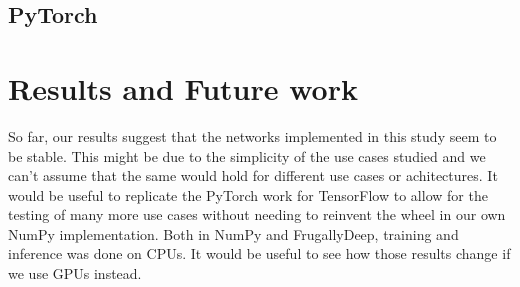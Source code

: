 \documentclass[a4paper,12pt]{article}
\begin{document}
\subsection{PyTorch}

\section{Results and Future work}
So far, our results suggest that the networks implemented in this study seem to
be stable. This might be due to the simplicity of the use cases studied and we
can't assume that the same would hold for different use cases or achitectures.
It would be useful to replicate the PyTorch work for TensorFlow to allow for the
testing of many more use cases without needing to reinvent the wheel in our own
NumPy implementation. Both in NumPy and FrugallyDeep, training and inference was
done on CPUs. It would be useful to see how those results change if we use GPUs
instead.
\end{document}
